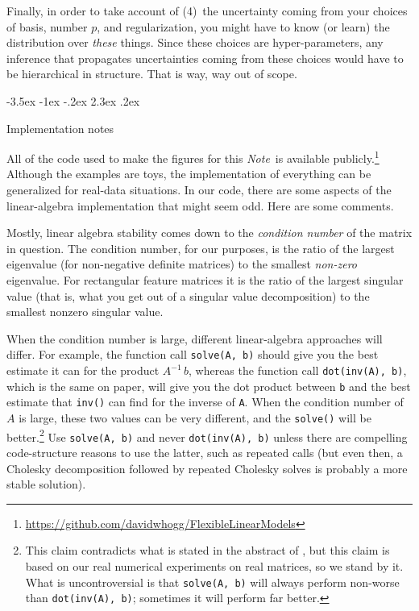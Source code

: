 \documentclass[12pt,letterpaper]{article}
\makeatletter
\renewcommand\section{\@startsection {section}{1}{\z@}%
  {-3.5ex \@plus -1ex \@minus -.2ex}%
  {2.3ex \@plus.2ex}%
  {\raggedright\normalfont\Large\bfseries}}
\newcommand{\documentname}{\textsl{Note}}
\newcommand{\code}[1]{\texttt{#1}}
\makeatother
\begin{document}
Finally, in order to take account of (4)~the uncertainty coming from your choices of basis, number $p$, and regularization, you might have to know (or learn) the distribution over \emph{these} things.
Since these choices are hyper-parameters, any inference that propagates uncertainties coming from these choices would have to be hierarchical in structure.
That is way, way out of scope.

\section{Implementation notes}\label{sec:implementation}

All of the code used to make the figures for this \documentname\ is available publicly.\footnote{\url{https://github.com/davidwhogg/FlexibleLinearModels}}
Although the examples are toys, the implementation of everything can be generalized for real-data situations.
In our code, there are some aspects of the linear-algebra implementation that might seem odd.
Here are some comments.

Mostly, linear algebra stability comes down to the \emph{condition number} of the matrix in question.
The condition number, for our purposes, is the ratio of the largest eigenvalue (for non-negative definite matrices) to the smallest \emph{non-zero} eigenvalue.
For rectangular feature matrices it is the ratio of the largest singular value (that is, what you get out of a singular value decomposition) to the smallest nonzero singular value.

When the condition number is large, different linear-algebra approaches will differ.
For example, the function call \code{solve(A, b)} should give you the best estimate it can for the product $A^{-1}\,b$, whereas the function call \code{dot(inv(A), b)}, which is the same on paper, will give you the dot product between \code{b} and the best estimate that \code{inv()} can find for the inverse of \code{A}.
When the condition number of $A$ is large, these two values can be very different, and the \code{solve()} will be better.\footnote{This claim contradicts what is stated in the abstract of \citet{solve}, but this claim is based on our real numerical experiments on real matrices, so we stand by it. What is uncontroversial is that \code{solve(A, b)} will always perform non-worse than \code{dot(inv(A), b)}; sometimes it will perform far better.}
Use \code{solve(A, b)} and never \code{dot(inv(A), b)} unless there are compelling code-structure reasons to use the latter, such as repeated calls (but even then, a Cholesky decomposition followed by repeated Cholesky solves is probably a more stable solution).
\end{document}
